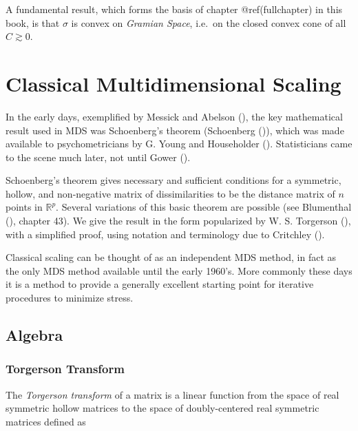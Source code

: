 \documentclass[
  12pt,
  letterpaper,
  DIV=11,
  numbers=noendperiod]{scrreprt}
\theoremstyle{remark}
\begin{document}
A fundamental result, which forms the basis of chapter @ref(fullchapter)
in this book, is that \(\sigma\) is convex on \emph{Gramian Space},
i.e.~on the closed convex cone of all \(C\gtrsim 0\).


\chapter{Classical Multidimensional
Scaling}\label{classical-multidimensional-scaling}

In the early days, exemplified by Messick and Abelson
(), the key mathematical result
used in MDS was Schoenberg's theorem (Schoenberg
()), which was made available to
psychometricians by G. Young and Householder
(). Statisticians came to the
scene much later, not until Gower ().

Schoenberg's theorem gives necessary and sufficient conditions for a
symmetric, hollow, and non-negative matrix of dissimilarities to be the
distance matrix of \(n\) points in \(\mathbb{R}^p\). Several variations
of this basic theorem are possible (see Blumenthal
(), chapter 43). We give the result in
the form popularized by W. S. Torgerson
(), with a simplified proof, using
notation and terminology due to Critchley
().

Classical scaling can be thought of as an independent MDS method, in
fact as the only MDS method available until the early 1960's. More
commonly these days it is a method to provide a generally excellent
starting point for iterative procedures to minimize stress.

\section{Algebra}\label{algebra}

\subsection{Torgerson Transform}\label{torgerson-transform}

The \emph{Torgerson transform} of a matrix is a linear function from the
space of real symmetric hollow matrices to the space of doubly-centered
real symmetric matrices defined as
\end{document}
